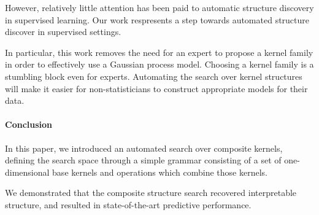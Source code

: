 \documentclass[twoside]{article}
\begin{document}
{However, relatively little attention has been paid to automatic structure discovery in supervised learning. %
%
Our work respresents a step towards automated structure discover in supervised settings.

In particular, this work removes the need for an expert to propose a kernel family in order to effectively use a Gaussian process model.  
Choosing a kernel family is a stumbling block even for experts.
Automating the search over kernel structures will make it easier for non-statisticians to construct appropriate models for their data.









\paragraph{Conclusion}

In this paper, we introduced an automated search over composite kernels, defining the search space through a simple grammar consisting of a set of one-dimensional base kernels and operations which combine those kernels.

We demonstrated that the composite structure search recovered interpretable structure, and resulted in state-of-the-art predictive performance.  %




}
\end{document}
